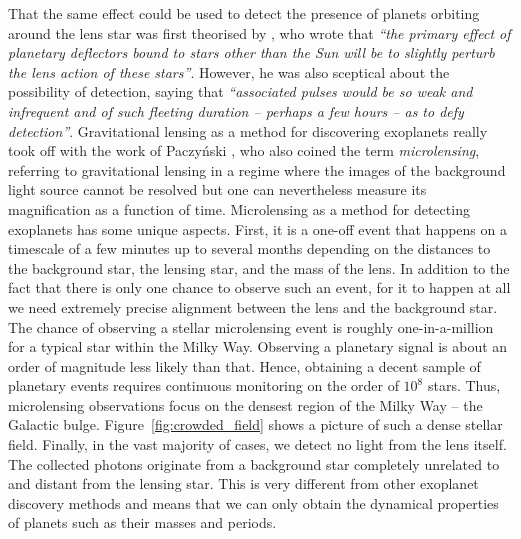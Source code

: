 \documentclass[12pt,dvipsnames]{report}
\begin{document}
That the same effect could be used to detect the presence of planets orbiting
around the lens star was first theorised by \citet{1964PhRv..133..835L}, who
wrote that \emph{``the primary effect of planetary deflectors bound to stars
    other than the Sun will be to slightly perturb the lens action of these
    stars''}. However, he was also sceptical about the possibility of detection,
saying that \emph{``associated pulses would be so weak and infrequent and of
    such fleeting duration -- perhaps a few hours -- as to defy detection''}.
Gravitational lensing as a method for discovering exoplanets really took off
with the work of Paczy\'nski
\citep{1986ApJ...304....1P,1986ApJ...301..503P,1991ApJ...374L..37M}, who also
coined the term \emph{microlensing}, referring to gravitational lensing in a
regime where the images of the background light source cannot be resolved but one can
nevertheless measure its magnification as a function of time. Microlensing as a
method for detecting exoplanets has some unique aspects. First, it is a one-off
event that happens on a timescale of a few minutes up to several months
depending on the distances to the background star, the lensing star, and the
mass of the lens. In addition to the fact that there is only one chance to
observe such an event, for it to happen at all we need extremely precise
alignment between the lens and the background star. The chance of observing
a stellar microlensing event is roughly one-in-a-million for a typical
star within the Milky Way. Observing a planetary signal is about an order of
magnitude less likely than that. Hence, obtaining a decent sample of planetary
events requires continuous monitoring on the order of $10^{8}$ stars. 
Thus, microlensing observations focus on the densest region of
the Milky Way -- the Galactic bulge. Figure~\ref{fig:crowded_field} shows a picture
of such a dense stellar field. Finally, in the vast majority of cases, we
detect no light from the lens itself. The collected photons originate from a
background star completely unrelated to and distant from the lensing star. This is
very different from other exoplanet discovery methods and means that we can only
obtain the dynamical properties of planets such as their masses and periods.
\end{document}
